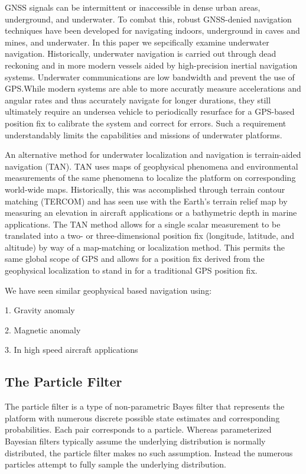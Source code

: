 \documentclass[]{article}
\begin{document}
GNSS signals can be intermittent or inaccessible in dense urban areas\cite{}, underground\cite{}, and underwater\cite{}. To combat this, robust GNSS-denied navigation techniques have been developed for navigating indoors\cite{indoor_survey}, underground in caves and mines\cite{papachristos2019mines}, and underwater\cite{underwater_survey}. In this paper we sepcifically examine underwater navigation. Historically, underwater navigation is carried out through dead reckoning and in more modern vessels aided by high-precision inertial navigation systems. Underwater communications are low bandwidth and prevent the use of GPS.\@ While modern systems are able to more accuratly measure accelerations and angular rates and thus accurately navigate for longer durations, they still ultimately require an undersea vehicle to periodically resurface for a GPS-based position fix to calibrate the system and correct for errors. Such a requirement understandably limits the capabilities and missions of underwater platforms.

An alternative method for underwater localization and navigation is terrain-aided navigation (TAN). TAN uses maps of geophysical phenomena and environmental measurements of the same phenomena to localize the platform on corresponding world-wide maps. Historically, this was accomplished through terrain contour matching (TERCOM)\cite{baker1977terrain} and has seen use with the Earth's terrain relief map by measuring an elevation in aircraft applications\cite{boozer1988TAN} or a bathymetric depth in marine applications\cite{williams2001towards_tan}. The TAN method allows for a single scalar measurement to be translated into a two- or three-dimensional position fix (longitude, latitude, and altitude) by way of a map-matching or localization method. This permits the same global scope of GPS and allows for a position fix derived from the geophysical localization to stand in for a traditional GPS position fix.

We have seen similar geophysical based navigation using:

1. Gravity anomaly

2. Magnetic anomaly

3. In high speed aircraft applications

\subsection{The Particle Filter}

The particle filter is a type of non-parametric Bayes filter that represents the platform with numerous discrete possible state estimates and corresponding probabilities. Each pair corresponds to a particle\cite{ProbRob}. Whereas parameterized Bayesian filters typically assume the underlying distribution is normally distributed, the particle filter makes no such assumption. Instead the numerous particles attempt to fully sample the underlying distribution.
\end{document}
